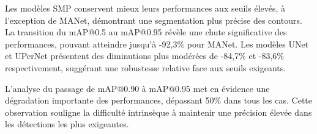 \begin{table}[H]
    \centering
    \caption{Performances moyennes mAP à différents seuils. Chute relative mAP@0.5 à mAP@0.95}
    \label{tab:performance_moyenne_map_different_seuils}
\end{table}

Les modèles SMP conservent mieux leurs performances aux seuils élevés, à l'exception de MANet, démontrant une segmentation plus précise des contours. La transition du mAP@0.5 au mAP@0.95 révèle une chute significative des performances, pouvant atteindre jusqu'à -92,3\% pour MANet. Les modèles UNet et UPerNet présentent des diminutions plus modérées de -84,7\% et -83,6\% respectivement, suggérant une robustesse relative face aux seuils exigeants.

L'analyse du passage de mAP@0.90 à mAP@0.95 met en évidence une dégradation importante des performances, dépassant 50\% dans tous les cas. Cette observation souligne la difficulté intrinsèque à maintenir une précision élevée dans les détections les plus exigeantes.

